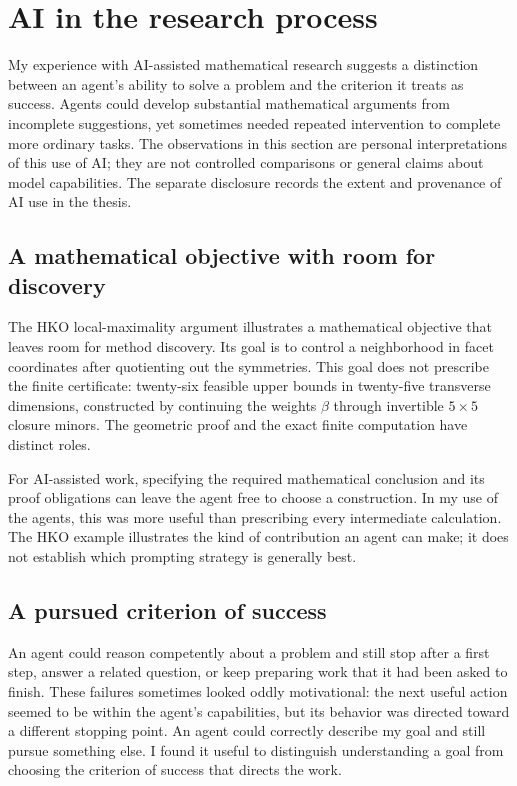 \clearpage
\section{AI in the research process}
\label{sec:use-of-ai}

My experience with AI-assisted mathematical research suggests a distinction
between an agent's ability to solve a problem and the criterion it treats as
success. Agents could develop substantial mathematical arguments from
incomplete suggestions, yet sometimes needed repeated intervention to
complete more ordinary tasks. The observations in this section are personal
interpretations of this use of AI; they are not controlled comparisons or
general claims about model capabilities. The separate disclosure records
the extent and provenance of AI use in the thesis.

\subsection{A mathematical objective with room for discovery}

The HKO local-maximality argument illustrates a mathematical objective that
leaves room for method discovery. Its goal is to control a neighborhood in
facet coordinates after quotienting out the symmetries. This goal does not
prescribe the finite certificate: twenty-six feasible upper bounds in
twenty-five transverse dimensions, constructed by continuing the weights
$\beta$ through invertible $5\times5$ closure minors. The geometric proof
and the exact finite computation have distinct roles.

For AI-assisted work, specifying the required mathematical conclusion and
its proof obligations can leave the agent free to choose a construction.
In my use of the agents, this was more useful than prescribing every
intermediate calculation. The HKO example illustrates the kind of
contribution an agent can make; it does not establish which prompting
strategy is generally best.

\subsection{A pursued criterion of success}

An agent could reason
competently about a problem and still stop after a first step, answer a
related question, or keep preparing work that it had been asked to finish.
These failures sometimes looked oddly motivational: the next useful action
seemed to be within the agent's capabilities, but its behavior was directed
toward a different stopping point. An agent could correctly describe my goal
and still pursue something else. I found it useful to distinguish understanding
a goal from choosing the criterion of success that directs the work.

